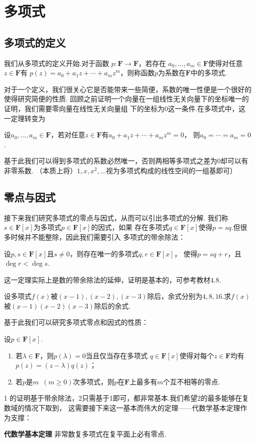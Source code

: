 \chapter{多项式}

\section{多项式的定义}

我们从多项式的定义开始.对于函数 $p:\mathbf{F}\to\mathbf{F}$，若存在
$a_0,\ldots,a_m\in\mathbf{F}$使得对任意$z\in\mathbf{F}$有
$p(z)=a_0+a_1z+\cdots+a_mz^m$，则称函数$p$为系数在$\mathbf{F}$中的多项式.

对于一个定义，我们很关心它是否能带来一些简便，系数的唯一性便是一个很好的使得研究简便的性质.
回顾之前证明一个向量在一组线性无关向量下的坐标唯一的证明，我们需要零向量在线性无关向量组
下的坐标为0这一条件.在多项式中，这一定理转变为
\begin{theorem}
    设$a_0,\ldots,a_m\in\mathbf{F}$，若对任意$z\in\mathbf{F}$有$a_0+a_1z+\cdots+a_mz^m=0$，
    则$a_0=\cdots=a_m=0$.
\end{theorem}
基于此我们可以得到多项式的系数必然唯一，否则两相等多项式之差为0却可以有非零系数.
（本质上将）$1,x,x^2,\ldots$视为多项式构成的线性空间的一组基即可）

\section{零点与因式}

接下来我们研究多项式的零点与因式，从而可以引出多项式的分解.
我们称$s\in\mathbf{F}[x]$为多项式$p\in\mathbf{F}[x]$的因式，如果
存在多项式$q\in\mathbf{F}[x]$使得$p=sq$.但很多时候并不能整除，因此我们需要引入
多项式的带余除法：
\begin{theorem}
    设$p,s\in\mathbf{F}[x]$且$s\neq 0$，则存在唯一的多项式$q,r\in\mathbf{F}[x]$，
    使得$p=sq+r$，且$\deg r<\deg s$.
\end{theorem}
这一定理实际上是数的带余除法的延伸，证明是基本的，可参考教材4.8.
\begin{example}
    设多项式$f(x)$被$(x-1),(x-2),(x-3)$除后，余式分别为$4,8,16$.求$f(x)$被$(x-1)(x-2)(x-3)$除后的余式.
\end{example}
基于此我们可以研究多项式零点和因式的性质：
\begin{theorem}
    设$p\in\mathbf{F}[x]$.
    \begin{enumerate}
        \item 若$\lambda\in\mathbf{F}$，则$p(\lambda)=0$当且仅当存在多项式
            $q\in\mathbf{F}[x]$使得对每个$z\in\mathbf{F}$均有$p(z)=(z-\lambda)q(z)$；

        \item 若$p$是$m\enspace(m \geqslant 0)$次多项式，则$p$在$\mathbf{F}$上最多有$m$个互不相等的零点.
    \end{enumerate}
\end{theorem}
1 的证明基于带余除法，2只需基于1即可，都非常基本.我们希望2的最多能够在复数域的情况下取到，
这需要接下来这一基本而伟大的定理——代数学基本定理作为支撑：
\begin{theorem} \textbf{\heiti 代数学基本定理} \label{th:14:fundamental-theorem-of-algebra}
    非常数复多项式在复平面上必有零点.
\end{theorem}

